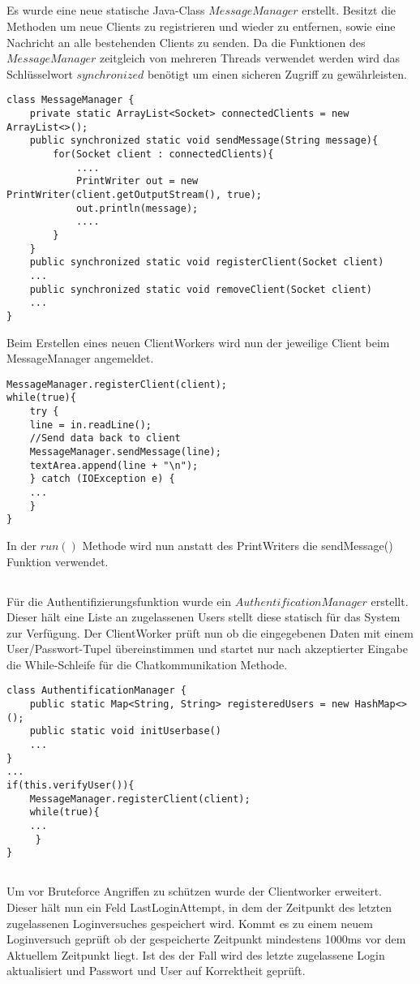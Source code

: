 \documentclass[12pt]{article}
\theoremstyle{plain}
\begin{document}
\subsection{}
Es wurde eine neue statische Java-Class $MessageManager$ erstellt.
Besitzt die Methoden um neue Clients zu registrieren und wieder zu entfernen, sowie eine Nachricht an alle bestehenden Clients zu senden.
Da die Funktionen des $MessageManager$ zeitgleich von mehreren Threads verwendet werden wird das Schlüsselwort $synchronized$ benötigt um einen sicheren Zugriff zu gewährleisten.
\begin{lstlisting}
class MessageManager {
	private static ArrayList<Socket> connectedClients = new ArrayList<>();
	public synchronized static void sendMessage(String message){
		for(Socket client : connectedClients){
			....			
			PrintWriter out = new PrintWriter(client.getOutputStream(), true);
			out.println(message);
			....
		}
	}
	public synchronized static void registerClient(Socket client)
	...
	public synchronized static void removeClient(Socket client)
	...
}
\end{lstlisting}
Beim Erstellen eines neuen ClientWorkers wird nun der jeweilige Client beim MessageManager angemeldet.
\begin{lstlisting}
MessageManager.registerClient(client);
while(true){
	try {
	line = in.readLine();
	//Send data back to client
	MessageManager.sendMessage(line);
	textArea.append(line + "\n");
	} catch (IOException e) {
	...
	}
}
\end{lstlisting}
In der $run()$ Methode wird nun anstatt des PrintWriters die sendMessage() Funktion verwendet.
\subsection{}
Für die Authentifizierungsfunktion wurde ein $AuthentificationManager$ erstellt.
Dieser hält eine Liste an zugelassenen Users stellt diese statisch für das System zur Verfügung.
Der ClientWorker prüft nun ob die eingegebenen Daten mit einem User/Passwort-Tupel übereinstimmen und startet nur nach akzeptierter Eingabe die While-Schleife für die Chatkommunikation Methode.
\begin{lstlisting}
class AuthentificationManager {
	public static Map<String, String> registeredUsers = new HashMap<>();
	public static void initUserbase()
	...
}
...
if(this.verifyUser()){
	MessageManager.registerClient(client);
	while(true){
	...
	 }
}
\end{lstlisting}
\subsection{}
Um vor Bruteforce Angriffen zu schützen wurde der Clientworker erweitert. Dieser hält nun ein Feld LastLoginAttempt, in dem der Zeitpunkt des letzten zugelassenen Loginversuches gespeichert wird. Kommt es zu einem neuem Loginversuch geprüft ob der gespeicherte Zeitpunkt mindestens 1000ms vor dem Aktuellem Zeitpunkt liegt. Ist des der Fall wird des letzte zugelassene Login aktualisiert und Passwort und User auf Korrektheit geprüft.
\end{document}
